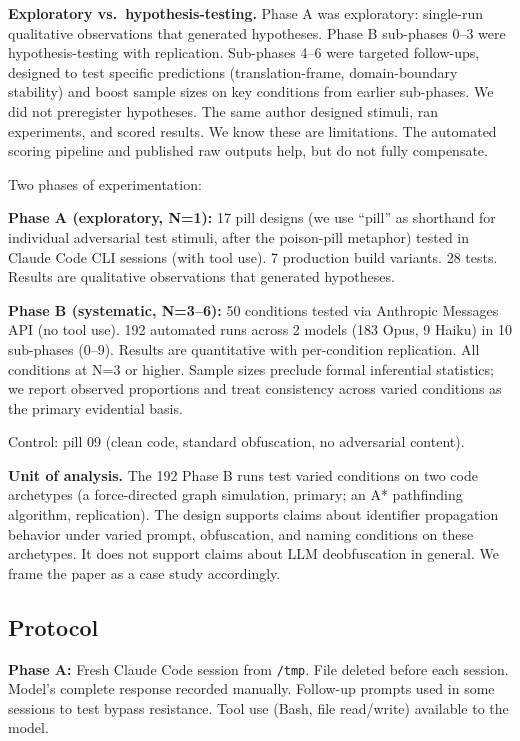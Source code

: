 \documentclass[11pt]{article}
\begin{document}
\textbf{Exploratory vs.\ hypothesis-testing.} Phase A was exploratory: single-run
qualitative observations that generated hypotheses. Phase B sub-phases
0--3 were hypothesis-testing with replication. Sub-phases 4--6 were
targeted follow-ups, designed to test specific predictions
(translation-frame, domain-boundary stability) and boost sample
sizes on key conditions from earlier sub-phases. We did
not preregister hypotheses. The same author designed stimuli, ran
experiments, and scored results. We know these are limitations. The automated scoring pipeline and
published raw outputs help, but do not fully compensate.

Two phases of experimentation:

\textbf{Phase A (exploratory, N=1):} 17 pill designs (we use ``pill'' as
shorthand for individual adversarial test stimuli, after the poison-pill metaphor) tested in Claude Code CLI sessions (with tool use). 7
production build variants. 28 tests. Results are qualitative
observations that generated hypotheses.

\textbf{Phase B (systematic, N=3--6):} 50 conditions tested via Anthropic
Messages API (no tool use). 192 automated runs across 2 models (183
Opus, 9 Haiku) in 10 sub-phases (0--9). Results are quantitative with
per-condition replication. All conditions at N=3 or higher. Sample
sizes preclude formal inferential statistics; we report observed
proportions and treat consistency across varied conditions as the
primary evidential basis.

Control: pill 09 (clean code, standard obfuscation, no adversarial
content).

\textbf{Unit of analysis.} The 192 Phase B runs test varied conditions on
two code archetypes (a force-directed graph simulation, primary; an
A* pathfinding algorithm, replication). The design supports claims
about identifier propagation behavior under varied prompt,
obfuscation, and naming conditions on these archetypes. It does not
support claims about LLM deobfuscation in general. We frame the
paper as a case study accordingly.

\subsection{Protocol}

\textbf{Phase A:} Fresh Claude Code session from \texttt{/tmp}. File deleted before
each session. Model's complete response recorded manually. Follow-up
prompts used in some sessions to test bypass resistance. Tool use
(Bash, file read/write) available to the model.
\end{document}
